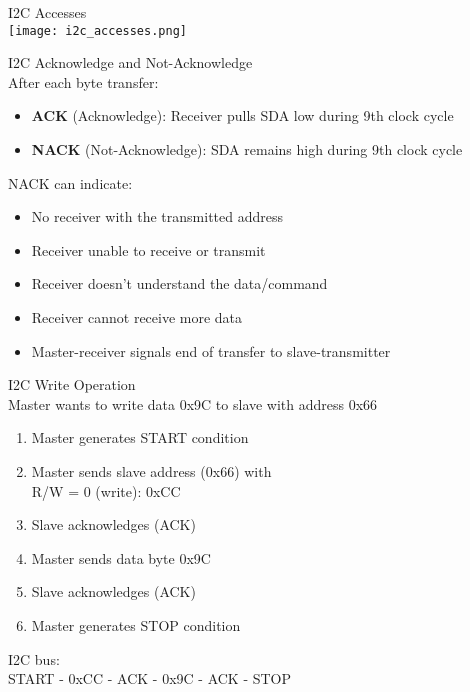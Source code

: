 \begin{minipage}{0.6\linewidth}

\begin{concept}{I2C Accesses}\\
\texttt{[image: i2c\_accesses.png]}
\end{concept}
\end{minipage}
\begin{minipage}{0.4\linewidth}
\begin{corollary}{I2C Acknowledge and Not-Acknowledge}\\
After each byte transfer:
\begin{itemize}
    \item \textbf{ACK} (Acknowledge): Receiver pulls SDA low during 9th clock cycle
    \item \textbf{NACK} (Not-Acknowledge): SDA remains high during 9th clock cycle
\end{itemize}
\vspace{1mm}
NACK can indicate:
\begin{itemize}
    \item No receiver with the transmitted address
    \item Receiver unable to receive or transmit
    \item Receiver doesn't understand the data/command
    \item Receiver cannot receive more data
    \item Master-receiver signals end of transfer to slave-transmitter
\end{itemize}
\end{corollary}
\end{minipage}




\begin{example2}{I2C Write Operation}\\
Master wants to write data 0x9C to slave with address 0x66
\tcblower
\begin{enumerate}
    \item Master generates START condition
    \item Master sends slave address (0x66) with \\ R/W = 0 (write): 0xCC
    \item Slave acknowledges (ACK)
    \item Master sends data byte 0x9C
    \item Slave acknowledges (ACK)
    \item Master generates STOP condition
\end{enumerate}
I2C bus:\\
START - 0xCC - ACK - 0x9C - ACK - STOP
\end{example2}

